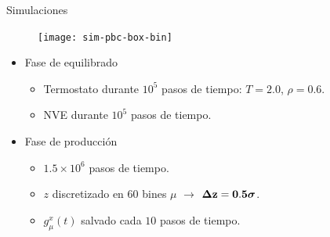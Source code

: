 \documentclass{beamer}
\begin{document}
\begin{frame}{Simulaciones}
  \begin{figure}
    \texttt{[image: sim-pbc-box-bin]}
  \end{figure}
   \begin{itemize}
     \item<1-> Fase de \alert{equilibrado}
       \begin{itemize}
         \item Termostato durante $10^5$ pasos de tiempo: $T=2.0$, $\rho=0.6$.
         \item NVE durante $10^5$ pasos de tiempo.
          \end{itemize}
        \item<2-> Fase de \alert{producción}
       \begin{itemize}
         \item $1.5\times10^6$ pasos de tiempo.
         \item $z$ discretizado en $60$ bines $\mu$ $\rightarrow$ {$\boldsymbol{\Delta} {\bf z=0.5}\boldsymbol{\sigma}$}.
         \item $g_{\mu}^x(t)$ salvado cada $10$ pasos de tiempo.
         \end{itemize}
     \end{itemize}
 \end{frame}

% 
\end{document}
